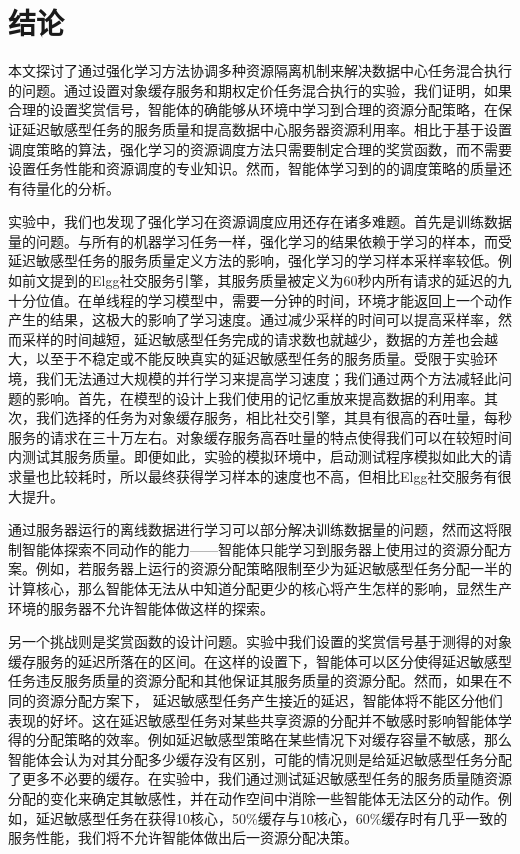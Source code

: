 \chapter{结论}
本文探讨了通过强化学习方法协调多种资源隔离机制来解决数据中心任务混合执行的问题。通过设置对象缓存服务和期权定价任务混合执行的实验，我们证明，如果合理的设置奖赏信号，智能体的确能够从环境中学习到合理的资源分配策略，在保证延迟敏感型任务的服务质量和提高数据中心服务器资源利用率。相比于基于设置调度策略的算法，强化学习的资源调度方法只需要制定合理的奖赏函数，而不需要设置任务性能和资源调度的专业知识。然而，智能体学习到的的调度策略的质量还有待量化的分析。

实验中，我们也发现了强化学习在资源调度应用还存在诸多难题。首先是训练数据量的问题。与所有的机器学习任务一样，强化学习的结果依赖于学习的样本，而受延迟敏感型任务的服务质量定义方法的影响，强化学习的学习样本采样率较低。例如前文提到的Elgg社交服务引擎，其服务质量被定义为60秒内所有请求的延迟的九十分位值。在单线程的学习模型中，需要一分钟的时间，环境才能返回上一个动作产生的结果，这极大的影响了学习速度。通过减少采样的时间可以提高采样率，然而采样的时间越短，延迟敏感型任务完成的请求数也就越少，数据的方差也会越大，以至于不稳定或不能反映真实的延迟敏感型任务的服务质量。受限于实验环境，我们无法通过大规模的并行学习来提高学习速度；我们通过两个方法减轻此问题的影响。首先，在模型的设计上我们使用的记忆重放来提高数据的利用率。其次，我们选择的任务为对象缓存服务，相比社交引擎，其具有很高的吞吐量，每秒服务的请求在三十万左右。对象缓存服务高吞吐量的特点使得我们可以在较短时间内测试其服务质量。即便如此，实验的模拟环境中，启动测试程序模拟如此大的请求量也比较耗时，所以最终获得学习样本的速度也不高，但相比Elgg社交服务有很大提升。

通过服务器运行的离线数据进行学习可以部分解决训练数据量的问题，然而这将限制智能体探索不同动作的能力——智能体只能学习到服务器上使用过的资源分配方案。例如，若服务器上运行的资源分配策略限制至少为延迟敏感型任务分配一半的计算核心，那么智能体无法从中知道分配更少的核心将产生怎样的影响，显然生产环境的服务器不允许智能体做这样的探索。

另一个挑战则是奖赏函数的设计问题。实验中我们设置的奖赏信号基于测得的对象缓存服务的延迟所落在的区间。在这样的设置下，智能体可以区分使得延迟敏感型任务违反服务质量的资源分配和其他保证其服务质量的资源分配。然而，如果在不同的资源分配方案下，
延迟敏感型任务产生接近的延迟，智能体将不能区分他们表现的好坏。这在延迟敏感型任务对某些共享资源的分配并不敏感时影响智能体学得的分配策略的效率。例如延迟敏感型策略在某些情况下对缓存容量不敏感，那么智能体会认为对其分配多少缓存没有区别，可能的情况则是给延迟敏感型任务分配了更多不必要的缓存。在实验中，我们通过测试延迟敏感型任务的服务质量随资源分配的变化来确定其敏感性，并在动作空间中消除一些智能体无法区分的动作。例如，延迟敏感型任务在获得10核心，50\%缓存与10核心，60\%缓存时有几乎一致的服务性能，我们将不允许智能体做出后一资源分配决策。


